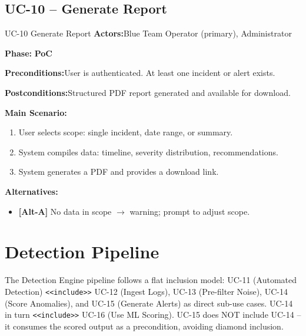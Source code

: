 \documentclass[12pt,a4paper]{report}
\newcommand{\ucfield}[2]{%
    \noindent\textbf{\color{helixpurplemid}#1:}\quad #2\par\medskip
}
\newcommand{\ucphase}[1]{%
    \noindent\textbf{\color{helixpurplemid}Phase:}\quad%
    \ifstrequal{#1}{PoC}{\textcolor{helixteal}{\textbf{PoC}}}{\textcolor{helixamber}{\textbf{Future MVP}}}%
    \par\medskip
}
\begin{document}
\section{UC-10 -- Generate Report}
\begin{ucbox}{UC-10 \quad Generate Report}
    \ucfield{Actors}{Blue Team Operator (primary), Administrator}
    \ucphase{PoC}
    \ucfield{Preconditions}{User is authenticated. At least one incident or alert exists.}
    \ucfield{Postconditions}{Structured PDF report generated and available for download.}
    \textbf{\color{helixpurplemid}Main Scenario:}
    \begin{enumerate}
        \item User selects scope: single incident, date range, or summary.
        \item System compiles data: timeline, severity distribution, recommendations.
        \item System generates a PDF and provides a download link.
    \end{enumerate}
    \textbf{\color{helixpurplemid}Alternatives:}
    \begin{itemize}
        \item \textbf{[Alt-A]} No data in scope $\rightarrow$ warning; prompt to adjust scope.
    \end{itemize}
\end{ucbox}

\chapter{Detection Pipeline}

The Detection Engine pipeline follows a flat inclusion model: UC-11 (Automated Detection) \texttt{<<include>>}
UC-12 (Ingest Logs), UC-13 (Pre-filter Noise), UC-14 (Score Anomalies), and UC-15 (Generate Alerts) as
direct sub-use cases. UC-14 in turn \texttt{<<include>>} UC-16 (Use ML Scoring). UC-15 does NOT include
UC-14 -- it consumes the scored output as a precondition, avoiding diamond inclusion.
\end{document}
